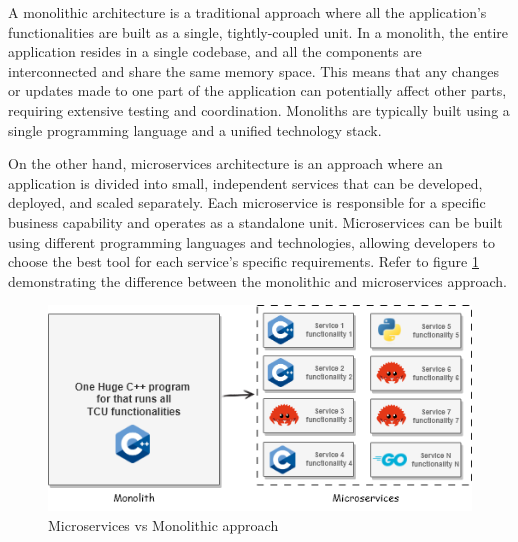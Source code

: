 \documentclass[
12pt,
oneside, 
onehalfspacing, 
nolistspacing, 
parskip, 
chapterinoneline, 
]{AASTCOMPUTER}
\begin{document}
A monolithic architecture is a traditional approach where all the application's functionalities are built as a single, tightly-coupled unit. In a monolith, the entire application resides in a single codebase, and all the components are interconnected and share the same memory space. This means that any changes or updates made to one part of the application can potentially affect other parts, requiring extensive testing and coordination. Monoliths are typically built using a single programming language and a unified technology stack.

On the other hand, microservices architecture is an approach where an application is divided into small, independent services that can be developed, deployed, and scaled separately. Each microservice is responsible for a specific business capability and operates as a standalone unit. Microservices can be built using different programming languages and technologies, allowing developers to choose the best tool for each service's specific requirements. Refer to figure \ref{fig:Micro_service_vs_monolith} demonstrating the difference between the monolithic and microservices approach.

\clearpage

\begin{figure}[h]
\centering
\includegraphics[scale=0.7]{Figures/14.png}
\caption[Microservices vs Monolithic approach]{Microservices vs Monolithic approach}
\label{fig:Micro_service_vs_monolith}
\end{figure}
\end{document}
